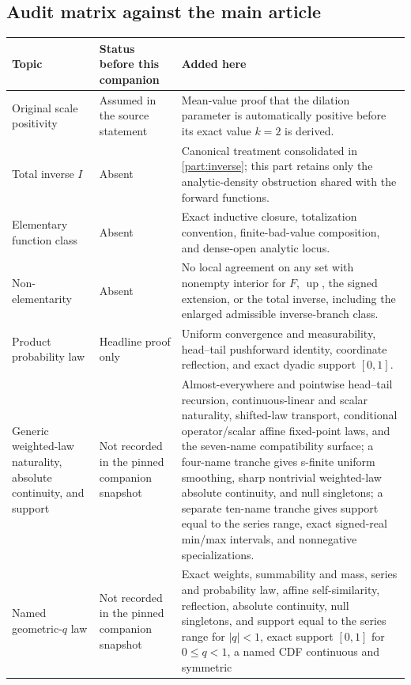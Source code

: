 \documentclass[11pt,oneside]{article}
\theoremstyle{definition}
\theoremstyle{remark}
\newcommand{\Up}{\operatorname{up}}
\begin{document}
\subsection{Audit matrix against the main article}
\label{integration:app:audit-matrix}

\begingroup\small
\begin{longtable}{@{}p{}p{}p{}@{}}
\toprule
Topic & Status before this companion & Added here\\
\midrule
\endhead
Original scale positivity & Assumed in the source statement & Mean-value proof that the dilation
parameter is automatically positive before its exact value $k=2$ is derived.\\
Total inverse $I$ & Absent & Canonical treatment consolidated in \cref{part:inverse}; this
part retains only the analytic-density obstruction shared with the forward functions.\\
Elementary function class & Absent & Exact inductive closure, totalization convention,
finite-bad-value composition, and dense-open analytic locus.\\
Non-elementarity & Absent & No local agreement on any set with nonempty interior for $F$,
$\Up$, the signed extension, or the total inverse, including the enlarged admissible
inverse-branch class.\\
Product probability law & Headline proof only & Uniform convergence and measurability,
head--tail pushforward identity, coordinate reflection, and exact dyadic support \([0,1]\).\\
Generic weighted-law naturality, absolute continuity, and support & Not recorded in the pinned companion snapshot &
Almost-everywhere and pointwise head--tail recursion, continuous-linear and scalar
naturality, shifted-law transport, conditional operator/scalar affine fixed-point laws, and
the seven-name compatibility surface; a four-name tranche gives s-finite uniform smoothing,
sharp nontrivial weighted-law absolute continuity, and null singletons; a separate ten-name
tranche gives support equal to the series range, exact signed-real min/max intervals, and
nonnegative specializations.\\
Named geometric-\(q\) law & Not recorded in the pinned companion snapshot &
Exact weights, summability and mass, series and probability law, affine self-similarity,
reflection, absolute continuity, null singletons, and support equal to the series range for
\(|q|<1\), exact support \([0,1]\) for \(0\le q<1\), a named CDF continuous and symmetric

\end{longtable}
\end{document}
